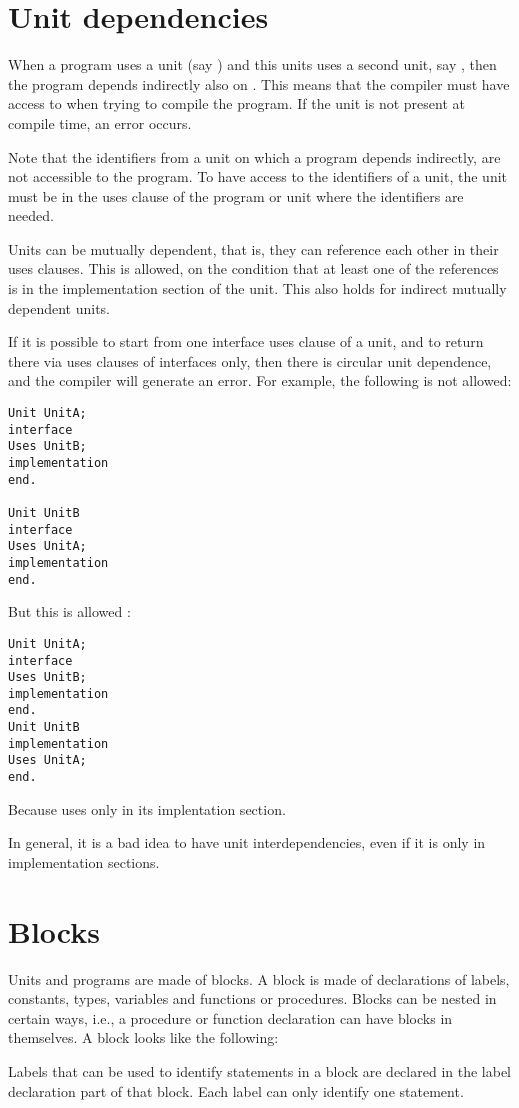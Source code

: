 \section{Unit dependencies}
When a program uses a unit (say ) and this units uses a second
unit, say , then the program depends indirectly also on
. This means that the compiler must have access to  when
trying to compile the program. If the unit is not present at compile time,
an error occurs.

Note that the identifiers from a unit on which a program depends indirectly,
are not accessible to the program. To have access to the identifiers of a
unit, the unit must be in the uses clause of the program or unit where the
identifiers are needed.

Units can be mutually dependent, that is, they can reference each other in
their uses clauses. This is allowed, on the condition that at least one of
the references is in the implementation section of the unit. This also holds
for indirect mutually dependent units.

If it is possible to start from one interface uses clause of a unit, and to return
there via uses clauses of interfaces only, then there is circular unit
dependence, and the compiler will generate an error.
For example, the following is not allowed:
\begin{verbatim}
Unit UnitA;
interface
Uses UnitB;
implementation
end.

Unit UnitB
interface
Uses UnitA;
implementation
end.
\end{verbatim}
But this is allowed :
\begin{verbatim}
Unit UnitA;
interface
Uses UnitB;
implementation
end.
Unit UnitB
implementation
Uses UnitA;
end.
\end{verbatim}
Because  uses  only in its implentation section.

In general, it is a bad idea to have unit interdependencies, even if it is
only in implementation sections.

\section{Blocks}
\label{se:blocks}
Units and programs are made of blocks. A block is made of declarations of
labels, constants, types, variables and functions or procedures. Blocks can
be nested in certain ways, i.e., a procedure or function declaration can
have blocks in themselves.
A block looks like the following:

Labels that can be used to identify statements in a block are declared in
the label declaration part of that block. Each label can only identify one
statement.

